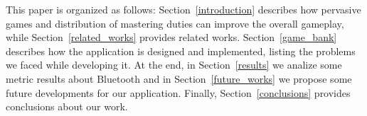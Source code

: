 This paper is organized as follows: Section~\ref{introduction} describes how 
pervasive games and distribution of mastering duties can improve the overall 
gameplay, while Section~\ref{related_works} provides related works. 
Section~\ref{game_bank} describes how the application is designed and 
implemented, listing the problems we faced while developing it. At the end, in 
Section~\ref{results} we analize some metric results about Bluetooth and in 
Section~\ref{future_works} we propose some future developments for our 
application. Finally, Section~\ref{conclusions} provides conclusions about our 
work.
